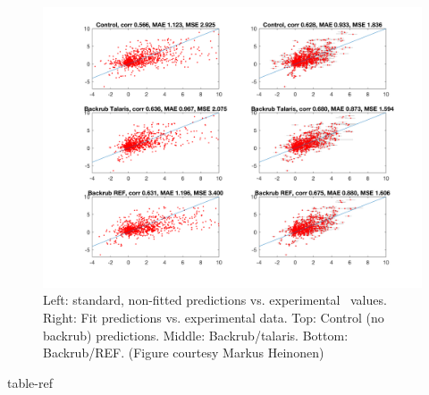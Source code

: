 \begin{figure}
  \centering
  \includegraphics[width=\textwidth,keepaspectratio]{figures/zemu-sigmoid2-corrs.png}
  \caption[Interface \ddg prediction performance with sigmoid fit score function]{
    Left: standard, non-fitted predictions vs. experimental \ddg\ values. Right: Fit predictions vs. experimental data. Top: Control (no backrub) predictions. Middle: Backrub/talaris. Bottom: Backrub/REF. (Figure courtesy Markus Heinonen)
  } \label{fig:t14-fit-scatter}
\end{figure}

{table-ref}

